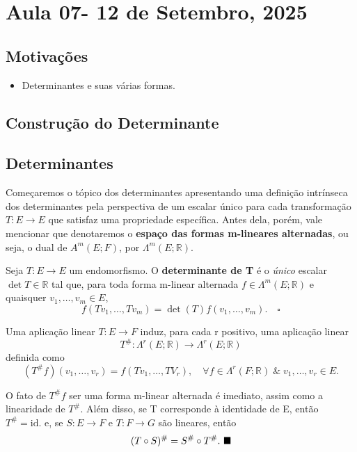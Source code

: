 \documentclass[../differential_forms.tex]{subfiles}
\begin{document}
\section{Aula 07- 12 de Setembro, 2025}
\subsection{Motivações}
\begin{itemize}
	\item Determinantes e suas várias formas.
\end{itemize}
\subsection{Construção do Determinante}
\subsection{Determinantes}
Começaremos o tópico dos determinantes apresentando uma definição intrínseca dos determinantes pela perspectiva de um escalar único para cada transformação \(T:E\rightarrow E\) que satisfaz uma propriedade específica. Antes dela, porém, vale mencionar que denotaremos o \textbf{espaço das formas m-lineares alternadas}, ou seja, o dual de \(A^{m}(E; F)\), por \(\Lambda^{m}(E; \mathbb{R})\).
\begin{def*}
	Seja \(T:E\rightarrow E\) um endomorfismo. O \textbf{determinante de T} é o \textit{único} escalar \(\det{T}\in \mathbb{R}\) tal que, para toda forma m-linear alternada \(f\in \Lambda^{m}(E; \mathbb{R})\) e quaisquer \(v_1,\dotsc , v_{m}\in E\),
	\[
		f(Tv_1,\dotsc , Tv_{m}) = \det{(T)} f(v_1,\dotsc ,v_{m}). \quad \square
	\]
\end{def*}
\begin{prop*}
	Uma aplicação linear \(T:E\rightarrow F\) induz, para cada r positivo, uma aplicação linear
	\[
		T^{\#}: \Lambda^{r}(E; \mathbb{R})\rightarrow \Lambda^{r}(E; \mathbb{R})
	\]
	definida como
	\[
		(T^{\#}f)(v_1,\dotsc ,v_r)= f(Tv_1,\dotsc ,TV_r),\quad \forall f\in \Lambda ^{r}(F; \mathbb{R})\;\&\; v_1,\dotsc ,v_r\in E.
	\]
\end{prop*}
\begin{proof*}
	O fato de \(T^{\#}f\) ser uma forma m-linear alternada é imediato, assim como a linearidade de \(T^{\#}.\) Além disso, se T corresponde à identidade de E, então \(T^{\#}=\mathrm{id}.\) e, se \(S:E\rightarrow F\) e \(T:F\rightarrow G\) são lineares, então
	\[
		(T \circ S)^{\#}=S^{\#}\circ T^{\#}.\text{ $\blacksquare$}
	\]
\end{proof*}
\end{document}
